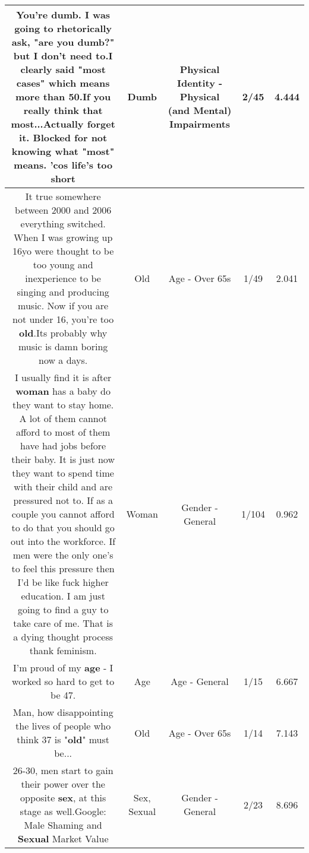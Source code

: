 \documentclass[11pt]{article}
\newlength\mylength
\begin{document}
\begin{center}
\begin{longtable}{|C{.65\mylength}|C{.30\mylength}|C{.12\mylength}|C{.12\mylength}|C{.12\mylength}|}
  \small You're \textbf{dumb}. I was going to rhetorically ask, "are you \textbf{dumb}?" but I don't need to.I clearly said "most cases" which means more than 50.If you really think that most...Actually forget it. Blocked for not knowing what "most" means. 'cos life's too short\normalsize   & Dumb & Physical Identity - Physical (and Mental) Impairments & 2/45 & 4.444 \\  \hline
  \small It true somewhere between 2000 and 2006 everything switched. When I was growing up 16yo were thought to be too young and inexperience to be singing and producing music. Now if you are not under 16, you're too \textbf{old}.Its probably why music is damn boring now a days.\normalsize   & Old & Age - Over 65s & 1/49 & 2.041 \\  \hline
  \small I usually find it is after \textbf{woman} has a baby do they want to stay home. A lot of them cannot afford to most of them have had jobs before their baby. It is just now they want to spend time with their child and are pressured not to. If as a couple you cannot afford to do that you should go out into the workforce. If men were the only one's to feel this pressure then I'd be like fuck higher education. I am just going to find a guy to take care of me. That is a dying thought process thank feminism.\normalsize   & Woman & Gender - General & 1/104 & 0.962 \\  \hline
  \small I'm proud of my \textbf{age} - I worked so hard to get to be 47.\normalsize   & Age & Age - General & 1/15 & 6.667 \\  \hline
  \small Man, how disappointing the lives of people who think 37 is "\textbf{old}" must be...\normalsize   & Old & Age - Over 65s & 1/14 & 7.143 \\  \hline
  \small 26-30, men start to gain their power over the opposite \textbf{sex}, at this stage as well.Google: Male Shaming and \textbf{Sexual} Market Value\normalsize   & Sex, Sexual & Gender - General & 2/23 & 8.696 \\  \hline

\end{longtable}
\end{center}
\end{document}
